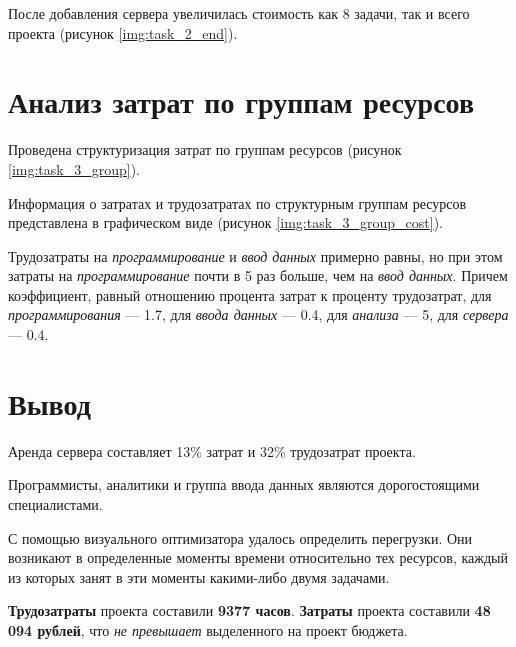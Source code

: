 После добавления сервера увеличилась стоимость как 8 задачи, так и всего проекта (рисунок \ref{img:task_2_end}).

\clearpage
\section{Анализ затрат по группам ресурсов}
Проведена структуризация затрат по группам ресурсов (рисунок \ref{img:task_3_group}).

Информация о затратах и трудозатратах по структурным группам ресурсов представлена в 
графическом виде (рисунок \ref{img:task_3_group_cost}).

\newpage
Трудозатраты на \textit{программирование} и \textit{ввод данных} примерно равны, но при этом затраты на \textit{программирование}
почти в 5 раз больше, чем на \textit{ввод данных}. Причем коэффициент, равный отношению процента затрат к 
проценту трудозатрат, для \textit{программирования} --- 1.7, для \textit{ввода данных} --- 0.4, для  \textit{анализа} --- 5, для \textit{сервера} --- 0.4.

\section{Вывод}

Аренда сервера составляет 13\% затрат и 32\% трудозатрат проекта.

Программисты, аналитики и группа ввода данных являются дорогостоящими специалистами.

С помощью визуального оптимизатора удалось определить перегрузки. Они возникают в
определенные моменты времени относительно тех ресурсов, каждый из которых 
занят в эти моменты какими-либо двумя задачами.

\textbf{Трудозатраты} проекта составили \textbf{9377 часов}. \textbf{Затраты} проекта составили \textbf{48 094 рублей}, что \textit{не превышает} выделенного на проект бюджета.
